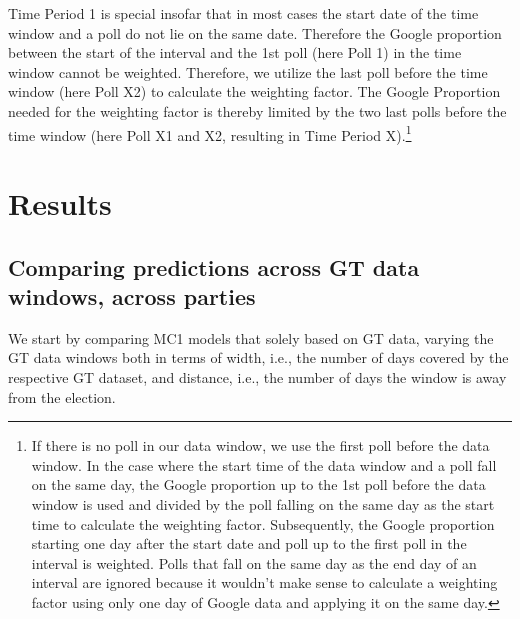 \documentclass[
  letterpaper,
  DIV=11,
  numbers=noendperiod]{scrartcl}
\begin{document}
Time Period 1 is special insofar that in most cases the start date of
the time window and a poll do not lie on the same date. Therefore the
Google proportion between the start of the interval and the 1st poll
(here Poll 1) in the time window cannot be weighted. Therefore, we
utilize the last poll before the time window (here Poll X2) to calculate
the weighting factor. The Google Proportion needed for the weighting
factor is thereby limited by the two last polls before the time window
(here Poll X1 and X2, resulting in Time Period X).\footnote{If there is
  no poll in our data window, we use the first poll before the data
  window. In the case where the start time of the data window and a poll
  fall on the same day, the Google proportion up to the 1st poll before
  the data window is used and divided by the poll falling on the same
  day as the start time to calculate the weighting factor. Subsequently,
  the Google proportion starting one day after the start date and poll
  up to the first poll in the interval is weighted. Polls that fall on
  the same day as the end day of an interval are ignored because it
  wouldn't make sense to calculate a weighting factor using only one day
  of Google data and applying it on the same day.}

\hypertarget{results}{%
\section{Results}\label{results}}

\hypertarget{comparing-predictions-across-gt-data-windows-across-parties}{%
\subsection{Comparing predictions across GT data windows, across
parties}\label{comparing-predictions-across-gt-data-windows-across-parties}}

We start by comparing MC1 models that solely based on GT data, varying
the GT data windows both in terms of width, i.e., the number of days
covered by the respective GT dataset, and distance, i.e., the number of
days the window is away from the election.
\end{document}

